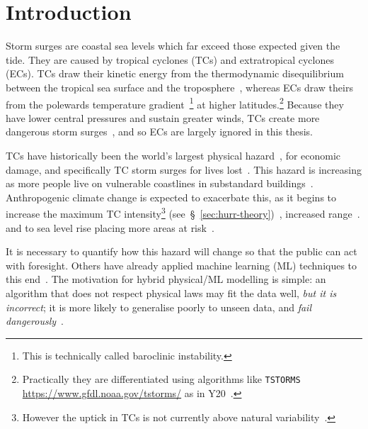 \section{Introduction}
\label{sec:1_Introduction}


Storm surges are coastal sea levels which far exceed those
expected given the tide.
They are caused by tropical cyclones
(TCs) and extratropical cyclones (ECs).
TCs draw their kinetic energy from the thermodynamic disequilibrium between
the tropical sea surface and the troposphere~\cite{emanuel1986air, emanuel1987dependence},
whereas ECs draw theirs from the
polewards temperature gradient~\cite{lorenz1960energy, holton2004introduction}\footnote{
This is technically called baroclinic instability.} at higher latitudes.\footnote{
Practically they are differentiated using algorithms like \texttt{TSTORMS}
\url{https://www.gfdl.noaa.gov/tstorms/} as in Y20~\cite{ZannaPreprint}.}
Because they have lower central pressures and sustain greater winds,
TCs create more dangerous storm surges~\cite{emanuel2005divine},
and so ECs are largely ignored in this thesis.

TCs have historically been the
world's largest physical hazard~\cite{shultz2005epidemiology},
for economic damage,
and specifically TC storm surges for lives lost~\cite{shultz2005epidemiology,
zhang2009tropical, emanuel2005divine}.
This hazard is increasing as more people live on vulnerable coastlines
in substandard buildings~\cite{emanuel2005divine}.
Anthropogenic climate change is expected to exacerbate this,
as it begins to increase the maximum TC intensity\footnote{
However the uptick in TCs is not currently above
 natural variability~\cite{mendelsohn2012impact}.}
(see~§~\ref{sec:hurr-theory})~\cite{emanuel2008hurricanes,emanuel2017will, nordhaus2010},
increased range~\cite{emanuel2008hurricanes, emanuel2017will, fedorov2010tropical, }.
and to sea level rise placing more areas at risk~\cite{SROCC}.

It is necessary to quantify how this hazard will change
so that the public can act with foresight.
Others have already applied machine learning (ML) techniques to this
end~\cite{kulp2019new, kulp2018coastaldem, tadesse2020data}.
The motivation for hybrid physical/ML modelling is simple:
an algorithm that does not respect physical laws
may fit the data well, \textit{but it is incorrect};
it is more likely to generalise poorly to unseen data,
and \textit{fail dangerously}~\cite{beucler2019achieving}.



